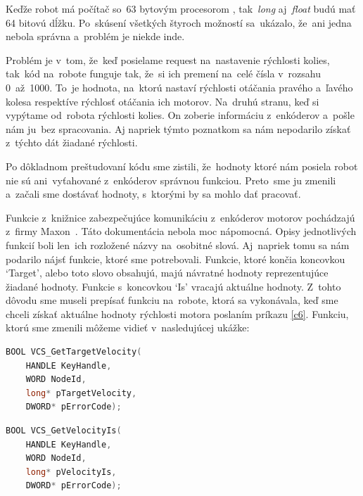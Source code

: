 Keďže robot má počítač so~63 bytovým procesorom \cite{robotPc}, tak~\textit{long} aj~\textit{float} budú mať 64 bitovú dĺžku. Po~skúsení všetkých
štyroch možností sa~ukázalo, že~ani jedna nebola správna a~problém je niekde inde.

Problém je v~tom, že~keď posielame request na~nastavenie rýchlosti kolies, tak~kód na~robote funguje tak, že~si ich premení na~celé čísla v~rozsahu
0~až~1000. To~je hodnota, na~ktorú nastaví rýchlosti otáčania pravého a~ľavého kolesa respektíve rýchlosť otáčania ich motorov. Na~druhú stranu,
keď si vypýtame od~robota rýchlosti kolies. On zoberie informáciu z~enkóderov a~pošle nám ju~bez spracovania. Aj napriek týmto poznatkom sa nám
nepodarilo získať z~týchto dát žiadané rýchlosti.

Po dôkladnom preštudovaní kódu sme zistili, že~hodnoty ktoré nám posiela robot nie sú ani~vyťahované z~enkóderov správnou funkciou. Preto~sme ju
zmenili a~začali sme dostávať hodnoty, s~ktorými by sa mohlo dať pracovať.

Funkcie z~knižnice zabezpečujúce komunikáciu z~enkóderov motorov pochádzajú z~firmy Maxon~\cite{EPOSdoc}. Táto dokumentácia nebola moc nápomocná.
Opisy jednotlivých funkcií boli len~ich rozložené názvy na~osobitné slová. Aj~napriek tomu sa nám podarilo nájsť funkcie, ktoré sme potrebovali.
Funkcie, ktoré končia koncovkou `Target', alebo toto slovo obsahujú, majú návratné hodnoty reprezentujúce žiadané hodnoty. Funkcie s~koncovkou
`Is' vracajú aktuálne hodnoty. Z~tohto dôvodu sme museli prepísať funkciu na~robote, ktorá sa vykonávala, keď sme chceli získať aktuálne hodnoty
rýchlosti motora poslaním príkazu \ref{c6}. Funkciu, ktorú sme zmenili môžeme vidieť v~nasledujúcej ukážke:


\label{VelocityIs}
\begin{lstlisting}[language=C++]
BOOL VCS_GetTargetVelocity(
	HANDLE KeyHandle,
	WORD NodeId,
	long* pTargetVelocity,
	DWORD* pErrorCode);
\end{lstlisting}

\begin{lstlisting}[language=C++]
BOOL VCS_GetVelocityIs(
	HANDLE KeyHandle,
	WORD NodeId,
	long* pVelocityIs,
	DWORD* pErrorCode);
\end{lstlisting}

